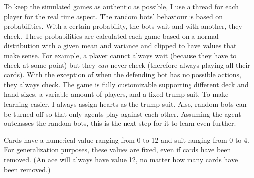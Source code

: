 \documentclass[a4paper,titlepage]{article}
\begin{document}
To keep the simulated games as authentic as possible, I use a thread for each player for the real time aspect. The random bots' behaviour is based on probabilities. With a certain probability, the bots wait and with another, they check. These probabilities are calculated each game based on a normal distribution with a given mean and variance and clipped to have values that make sense. For example, a player cannot always wait (because they have to check at some point) but they \emph{can} never check (therefore always playing all their cards). With the exception of when the defending bot has no possible actions, they always check. The game is fully customizable supporting different deck and hand sizes, a variable amount of players, and a fixed trump suit. To make learning easier, I always assign hearts as the trump suit. Also, random bots can be turned off so that only agents play against each other. Assuming the agent outclasses the random bots, this is the next step for it to learn even further.

Cards have a numerical value ranging from 0 to 12 and suit ranging from 0 to 4. For generalization purposes, these values are fixed, even if cards have been removed. (An ace will always have value 12, no matter how many cards have been removed.)
\end{document}
